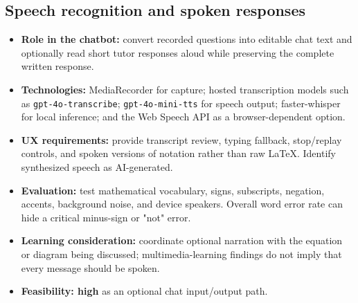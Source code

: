 \documentclass[11pt]{article}
\begin{document}
\subsection{Speech recognition and spoken responses}
\begin{itemize}
\item \textbf{Role in the chatbot:} convert recorded questions into editable chat text and optionally read short tutor responses aloud while preserving the complete written response.
\item \textbf{Technologies:} MediaRecorder for capture; hosted transcription models such as \texttt{gpt-4o-transcribe}; \texttt{gpt-4o-mini-tts} for speech output; faster-whisper for local inference; and the Web Speech API as a browser-dependent option.\cite{recorder,stt,tts,whisper,webspeech}
\item \textbf{UX requirements:} provide transcript review, typing fallback, stop/replay controls, and spoken versions of notation rather than raw LaTeX. Identify synthesized speech as AI-generated.
\item \textbf{Evaluation:} test mathematical vocabulary, signs, subscripts, negation, accents, background noise, and device speakers. Overall word error rate can hide a critical minus-sign or "not" error.
\item \textbf{Learning consideration:} coordinate optional narration with the equation or diagram being discussed; multimedia-learning findings do not imply that every message should be spoken.\cite{multimedia}
\item \textbf{Feasibility: high} as an optional chat input/output path.
\end{itemize}
\end{document}
